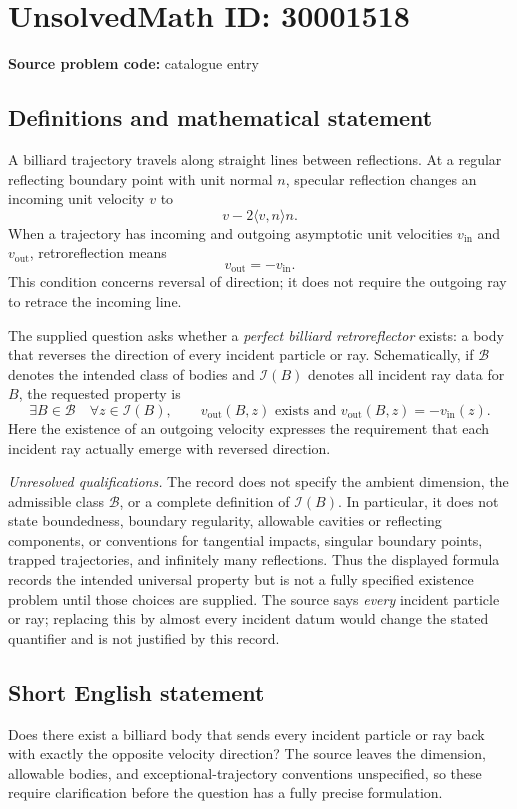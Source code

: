 \documentclass[11pt]{article}
\begin{document}
\section*{UnsolvedMath ID: 30001518}
\textbf{Source problem code:} catalogue entry
\subsection{Definitions and mathematical statement}
A billiard trajectory travels along straight lines between reflections. At a regular reflecting boundary point with unit normal \(n\), specular reflection changes an incoming unit velocity \(v\) to
\[
 v-2\langle v,n\rangle n.
\]
When a trajectory has incoming and outgoing asymptotic unit velocities \(v_{\mathrm{in}}\) and \(v_{\mathrm{out}}\), retroreflection means
\[
 v_{\mathrm{out}}=-v_{\mathrm{in}}.
\]
This condition concerns reversal of direction; it does not require the outgoing ray to retrace the incoming line.

The supplied question asks whether a \emph{perfect billiard retroreflector} exists: a body that reverses the direction of every incident particle or ray. Schematically, if \(\mathcal B\) denotes the intended class of bodies and \(\mathcal I(B)\) denotes all incident ray data for \(B\), the requested property is
\[
 \exists B\in\mathcal B\quad
 \forall z\in\mathcal I(B),\qquad
 v_{\mathrm{out}}(B,z)\text{ exists and }
 v_{\mathrm{out}}(B,z)=-v_{\mathrm{in}}(z).
\]
Here the existence of an outgoing velocity expresses the requirement that each incident ray actually emerge with reversed direction.

\emph{Unresolved qualifications.} The record does not specify the ambient dimension, the admissible class \(\mathcal B\), or a complete definition of \(\mathcal I(B)\). In particular, it does not state boundedness, boundary regularity, allowable cavities or reflecting components, or conventions for tangential impacts, singular boundary points, trapped trajectories, and infinitely many reflections. Thus the displayed formula records the intended universal property but is not a fully specified existence problem until those choices are supplied. The source says \emph{every} incident particle or ray; replacing this by almost every incident datum would change the stated quantifier and is not justified by this record.
\subsection{Short English statement}
Does there exist a billiard body that sends every incident particle or ray back with exactly the opposite velocity direction? The source leaves the dimension, allowable bodies, and exceptional-trajectory conventions unspecified, so these require clarification before the question has a fully precise formulation.
\end{document}
